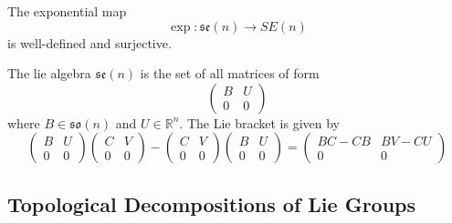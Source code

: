\documentclass{article}
\newcounter{theorem}[section]
\newcounter{example}[section]
\begin{document}
    \begin{theorem}
      \label{thm:surjectivity-of-exp-on-mathfraksen}
      The exponential map
      \begin{equation}
        \exp: \mathfrak{se}(n) \rightarrow SE(n)
      \end{equation}
      is well-defined and surjective. 
    \end{theorem}

      \begin{example}
        \label{ex:the-lie-algebra-mathfraksen}
        The lie algebra $\mathfrak{se}(n)$ is the set of all matrices of form 
        \begin{equation}
          \begin{pmatrix}
          B & U \\ 0 & 0
          \end{pmatrix}
        \end{equation}
        where $B \in \mathfrak{so}(n)$ and $U \in \mathbb{R}^n$. The Lie bracket is given by
        \begin{equation}
          \begin{pmatrix}
          B & U \\ 0 & 0
          \end{pmatrix} \begin{pmatrix}
          C & V \\ 0 & 0
          \end{pmatrix} - \begin{pmatrix}
          C & V \\ 0 & 0
          \end{pmatrix} \begin{pmatrix}
          B & U \\ 0 & 0
          \end{pmatrix} = \begin{pmatrix}
          BC - CB & BV - CU \\ 0 & 0
          \end{pmatrix}
        \end{equation}
      \end{example}


  \subsection{Topological Decompositions of Lie Groups}
\end{document}
